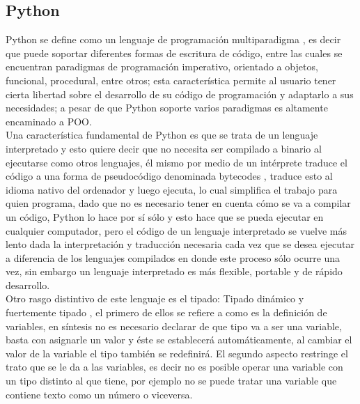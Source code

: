 \documentclass[11pt,lettersize]{article} %
\begin{document}
\subsection{Python}
\label{S-python}
%
Python se define como un lenguaje de programación multiparadigma \cite{Python}, es decir que puede soportar diferentes formas de escritura de código, entre las cuales se encuentran paradigmas de programación imperativo, orientado a objetos, funcional, procedural, entre otros; esta característica permite al usuario tener cierta libertad sobre el desarrollo de su código de programación y adaptarlo a sus necesidades; a pesar de que Python soporte varios paradigmas es altamente encaminado a POO. \\

Una característica fundamental de Python es que se trata de un lenguaje interpretado y esto quiere decir que no necesita ser compilado a binario al ejecutarse como otros lenguajes, él mismo por medio de un intérprete traduce el código a una forma de pseudocódigo denominada bytecodes \cite{GonzalezPython}, traduce esto al idioma nativo del ordenador y luego ejecuta, lo cual simplifica el trabajo para quien programa, dado que no es necesario tener en cuenta cómo se va a compilar un código, Python lo hace por sí sólo y esto hace que se pueda ejecutar en cualquier computador, pero el código de un lenguaje interpretado se vuelve más lento dada la interpretación y traducción necesaria cada vez que se desea ejecutar a diferencia de los lenguajes compilados en donde este proceso sólo ocurre una vez, sin embargo un lenguaje interpretado es más flexible, portable y de rápido desarrollo. \\

Otro rasgo distintivo de este lenguaje es el tipado: Tipado dinámico y fuertemente tipado \cite{Swaroop2013}\cite{GonzalezPython}, el primero de ellos se refiere a como es la definición de variables, en síntesis no es necesario declarar de que tipo va a ser una variable, basta con asignarle un valor y éste se establecerá automáticamente, al cambiar el valor de la variable el tipo también se redefinirá. El segundo aspecto restringe el trato que se le da a las variables, es decir no es posible operar una variable con un tipo distinto al que tiene, por ejemplo no se puede tratar una variable que contiene texto como un número o viceversa. \\
\end{document}

